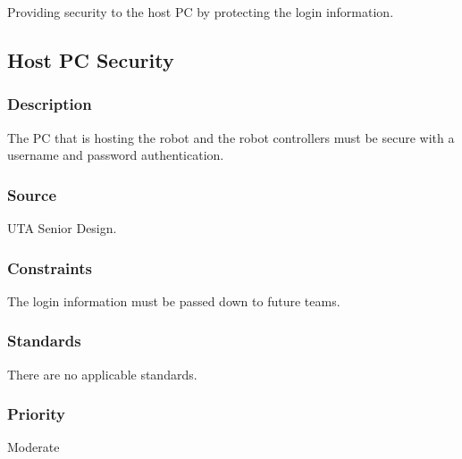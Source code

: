 Providing security to the host PC by protecting the login information.

\subsection{Host PC Security}
\subsubsection{Description}
The PC that is hosting the robot and the robot controllers must be secure with a username and password authentication.\subsubsection{Source}
UTA Senior Design.
\subsubsection{Constraints}
The login information must be passed down to future teams.
\subsubsection{Standards}
There are no applicable standards.
\subsubsection{Priority}
Moderate